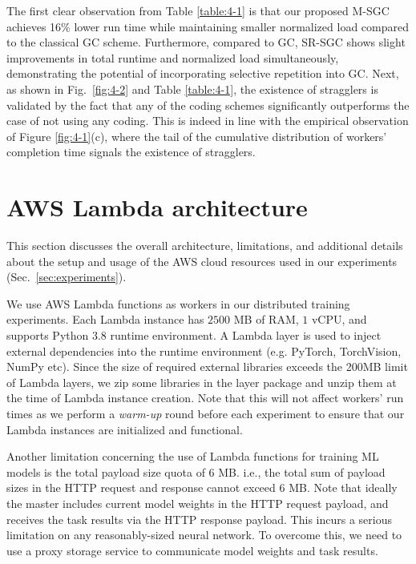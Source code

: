 The first clear observation from Table \ref{table:4-1} is that our proposed M-SGC achieves 16\% lower run time while maintaining smaller normalized load compared to the classical GC scheme. Furthermore, compared to GC, SR-SGC shows slight improvements in total runtime and normalized load simultaneously, demonstrating the potential of incorporating selective repetition into GC. Next, as shown in Fig.~\ref{fig:4-2} and Table \ref{table:4-1}, the existence of stragglers is validated by the fact that any of the coding schemes significantly outperforms the case of not using any coding. This is indeed in line with the empirical observation of Figure \ref{fig:4-1}(c), where the tail of the cumulative distribution of workers' completion time signals the existence of stragglers.





\section{AWS Lambda architecture}\label{sec:lambda}

This section discusses the overall architecture, limitations, and additional details about the setup and usage of the AWS cloud resources used in our experiments (Sec.~\ref{sec:experiments}). 

We use AWS Lambda functions as workers in our distributed training experiments. Each Lambda instance has $2500$ MB of RAM, $1$ vCPU, and supports Python 3.8 runtime environment. A Lambda layer is used to inject external dependencies into the runtime environment (e.g. PyTorch, TorchVision, NumPy etc). Since the size of required external libraries exceeds the 200MB limit of Lambda layers, we zip some libraries in the layer package and unzip them at the time of Lambda instance creation. Note that this will not affect workers' run times as we perform a \textit{warm-up} round before each experiment to ensure that our Lambda instances are initialized and functional. 

Another limitation concerning the use of Lambda functions for training ML models is the total payload size quota of $6$ MB. i.e., the total sum of payload sizes in the HTTP request and response cannot exceed $6$ MB. Note that ideally the master includes current model weights in the HTTP request payload, and receives the task results via the HTTP response payload. This incurs a serious limitation on any reasonably-sized neural network. To overcome this, we need to use a proxy storage service to communicate model weights and task results.

